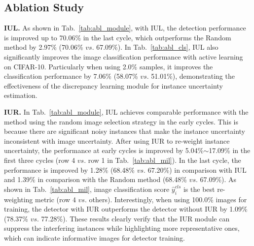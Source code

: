 \documentclass[final]{cvpr}
\begin{document}
\subsection{Ablation Study}

\textbf{IUL.} 
As shown in Tab.~\ref{tab:abl_module}, with IUL, the detection performance is improved up to 70.06\% in the last cycle, which outperforms the Random method by 2.97\% (70.06\% $vs.$ 67.09\%). In Tab.~\ref{tab:abl_cls}, IUL also significantly improves the image classification performance with active learning on CIFAR-10. Particularly when using 2.0\% samples, it improves the classification performance by 7.06\% (58.07\% $vs.$ 51.01\%), demonstrating the effectiveness of the discrepancy learning module for instance uncertainty estimation. 


\textbf{IUR.} In Tab.~\ref{tab:abl_module}, IUL achieves comparable performance with the method using the random image selection strategy in the early cycles. This is because there are significant noisy instances that make the instance uncertainty inconsistent with image uncertainty.
After using IUR to re-weight instance uncertainty, the performance at early cycles is improved by 5.04\%$\sim$17.09\% in the first three cycles (row 4 $vs.$ row 1 in Tab.~\ref{tab:abl_mil}). 
In the last cycle, the performance is improved by 1.28\% (68.48\% $vs.$ 67.20\%) in comparison with IUL and 1.39\% in comparison with the Random method (68.48\% $vs.$ 67.09\%). As shown in Tab.~\ref{tab:abl_mil}, image classification score $\hat{y}_{i}^{cls}$ is the best re-weighting metric (row 4 $vs.$ others).
Interestingly, when using 100.0\% images for training, the detector with IUR outperforms the detector without IUR by 1.09\% (78.37\% $vs.$ 77.28\%).
These results clearly verify that the IUR module can suppress the interfering instances while highlighting more representative ones, which can indicate informative images for detector training.
\end{document}
